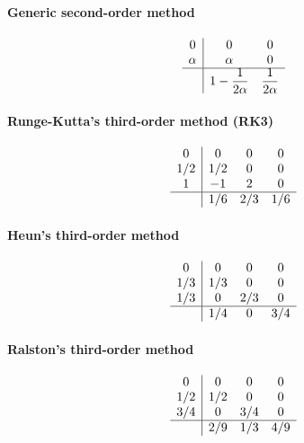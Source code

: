 \paragraph{Generic second-order method}

\begin{equation}
	\begin{array}{c|cc}
		0      & 0      & 0 \\
		\alpha & \alpha & 0 \\ \hline
		       & 1-\dfrac{1}{2\alpha} & \dfrac{1}{2\alpha}
	\end{array}
	\label{eq::generic_second}
\end{equation}

\paragraph{Runge-Kutta's third-order method (RK3)}

\begin{equation}
	\begin{array}
	{c|ccc}
		0   &  0  & 0   & 0 \\
		1/2 & 1/2 & 0   & 0 \\
		1   & -1  & 2   & 0 \\ \hline
		    & 1/6 & 2/3 & 1/6
	\end{array}
		\label{eq::RK3}
\end{equation}

\paragraph{Heun's third-order method}

\begin{equation}
	\begin{array}{c|ccc}
		0   & 0   & 0   & 0 \\
		1/3 & 1/3 & 0   & 0 \\
		1/3 & 0   & 2/3 & 0 \\ \hline
		    & 1/4 & 0   & 3/4
	\end{array}
	\label{eq::heun3}
\end{equation}

\paragraph{Ralston's third-order method}

\begin{equation}
	\begin{array}{c|ccc}
		0   & 0   & 0   & 0 \\
		1/2 & 1/2 & 0   & 0 \\
		3/4 & 0   & 3/4 & 0 \\ \hline
		    & 2/9 & 1/3 & 4/9
	\end{array}
	\label{eq::ralston3}
\end{equation}


